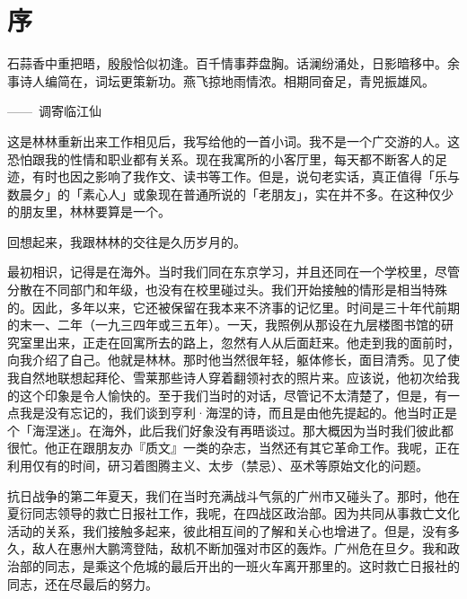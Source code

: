 
\chapter{\FK 序}

{\FS

    \hfill\parbox{0.5\textwidth}{\FK
        石蒜香中重把晤，殷殷恰似初逢。百千情事莽盘胸。话澜纷涌处，日影暗移中。余事诗人编简在，词坛更策新功。燕飞掠地雨情浓\footnotemark[1]。相期同奋足，青兕振雄风。

        \hfill——~调寄临江仙
    }


    \bigskip

    这是林林重新出来工作相见后，我写给他的一首小词。我不是一个广交游的人。这恐怕跟我的性情和职业都有关系。现在我寓所的小客厅里，每天都不断客人的足迹，有时也因之影响了我作文、读书等工作。但是，说句老实话，真正值得「乐与数晨夕」的「素心人」或象现在普通所说的「老朋友」，实在并不多。在这种仅少的朋友里，林林要算是一个。

    回想起来，我跟林林的交往是久历岁月的。

    最初相识，记得是在海外。当时我们同在东京学习，并且还同在一个学校里，尽管分散在不同部门和年级，也没有在校里碰过头。我们开始接触的情形是相当特殊的。因此，多年以来，它还被保留在我本来不济事的记忆里。时间是三十年代前期的末一、二年（一九三四年或三五年）。一天，我照例从那设在九层楼图书馆的研究室里出来，正走在回寓所去的路上，忽然有人从后面赶来。他走到我的面前时，向我介绍了自己。他就是林林。那时他当然很年轻，躯体修长，面目清秀。见了使我自然地联想起拜伦、雪莱那些诗人穿着翻领衬衣的照片来。应该说，他初次给我的这个印象是令人愉快的。至于我们当时的对话，尽管记不太清楚了，但是，有一点我是没有忘记的，我们谈到亨利·海涅的诗，而且是由他先提起的。他当时正是个「海涅迷」。在海外，此后我们好象没有再晤谈过。那大概因为当时我们彼此都很忙。他正在跟朋友办『质文』一类的杂志，当然还有其它革命工作。我呢，正在利用仅有的时间，研习着图腾主义、太步（禁忌）、巫术等原始文化的问题。

    抗日战争的第二年夏天，我们在当时充满战斗气氛的广州市又碰头了。那时，他在夏衍同志领导的救亡日报社工作，我呢，在四战区政治部。因为共同从事救亡文化活动的关系，我们接触多起来，彼此相互间的了解和关心也增进了。但是，没有多久，敌人在惠州大鹏湾登陆，敌机不断加强对市区的轰炸。广州危在旦夕。我和政治部的同志，是乘这个危城的最后开出的一班火车离开那里的。这时救亡日报社的同志，还在尽最后的努力。

}
